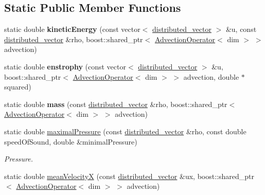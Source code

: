 \subsection*{Static Public Member Functions}
\begin{DoxyCompactItemize}
\item 
\hypertarget{classnatrium_1_1PhysicalProperties_a153e1a29848b78871687c2399f6a12f0}{
static double {\bfseries kineticEnergy} (const vector$<$ \hyperlink{namespacenatrium_a903d2b92917f582f2ff05f52160ab811}{distributed\_\-vector} $>$ \&u, const \hyperlink{namespacenatrium_a903d2b92917f582f2ff05f52160ab811}{distributed\_\-vector} \&rho, boost::shared\_\-ptr$<$ \hyperlink{classnatrium_1_1AdvectionOperator}{AdvectionOperator}$<$ dim $>$ $>$ advection)}
\label{classnatrium_1_1PhysicalProperties_a153e1a29848b78871687c2399f6a12f0}

\item 
\hypertarget{classnatrium_1_1PhysicalProperties_a180d8bbf48d8d40a0efb349dfab885f1}{
static double {\bfseries enstrophy} (const vector$<$ \hyperlink{namespacenatrium_a903d2b92917f582f2ff05f52160ab811}{distributed\_\-vector} $>$ \&u, boost::shared\_\-ptr$<$ \hyperlink{classnatrium_1_1AdvectionOperator}{AdvectionOperator}$<$ dim $>$ $>$ advection, double $\ast$squared)}
\label{classnatrium_1_1PhysicalProperties_a180d8bbf48d8d40a0efb349dfab885f1}

\item 
\hypertarget{classnatrium_1_1PhysicalProperties_a54ac981f3647685a02316b82b93099a8}{
static double {\bfseries mass} (const \hyperlink{namespacenatrium_a903d2b92917f582f2ff05f52160ab811}{distributed\_\-vector} \&rho, boost::shared\_\-ptr$<$ \hyperlink{classnatrium_1_1AdvectionOperator}{AdvectionOperator}$<$ dim $>$ $>$ advection)}
\label{classnatrium_1_1PhysicalProperties_a54ac981f3647685a02316b82b93099a8}

\item 
\hypertarget{classnatrium_1_1PhysicalProperties_ab7610e7ba47e6ff4ef73c4b6071d67e9}{
static double \hyperlink{classnatrium_1_1PhysicalProperties_ab7610e7ba47e6ff4ef73c4b6071d67e9}{maximalPressure} (const \hyperlink{namespacenatrium_a903d2b92917f582f2ff05f52160ab811}{distributed\_\-vector} \&rho, const double speedOfSound, double \&minimalPressure)}
\label{classnatrium_1_1PhysicalProperties_ab7610e7ba47e6ff4ef73c4b6071d67e9}

\begin{DoxyCompactList}\small\item\em Pressure. \item\end{DoxyCompactList}\item 
\hypertarget{classnatrium_1_1PhysicalProperties_a2b4446026df3dc765c81ef4f9ae7ed78}{
static double \hyperlink{classnatrium_1_1PhysicalProperties_a2b4446026df3dc765c81ef4f9ae7ed78}{meanVelocityX} (const \hyperlink{namespacenatrium_a903d2b92917f582f2ff05f52160ab811}{distributed\_\-vector} \&ux, boost::shared\_\-ptr$<$ \hyperlink{classnatrium_1_1AdvectionOperator}{AdvectionOperator}$<$ dim $>$ $>$ advection)}
\label{classnatrium_1_1PhysicalProperties_a2b4446026df3dc765c81ef4f9ae7ed78}


\end{DoxyCompactItemize}
